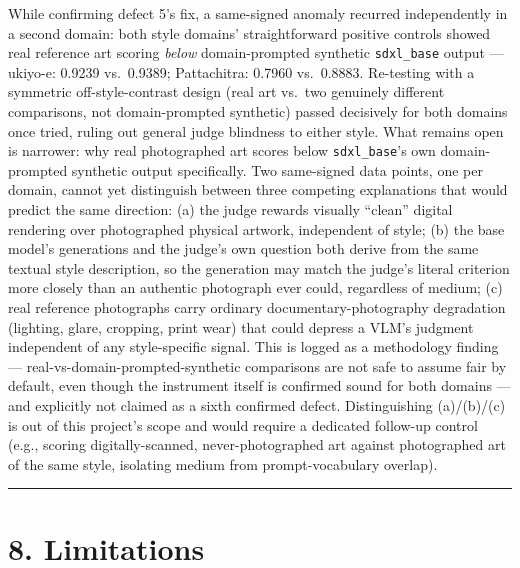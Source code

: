 While confirming defect 5's fix, a same-signed anomaly recurred
independently in a second domain: both style domains' straightforward
positive controls showed real reference art scoring \emph{below}
domain-prompted synthetic \texttt{sdxl\_base} output --- ukiyo-e: 0.9239
vs.~0.9389; Pattachitra: 0.7960 vs.~0.8883. Re-testing with a symmetric
off-style-contrast design (real art vs.~two genuinely different
comparisons, not domain-prompted synthetic) passed decisively for both
domains once tried, ruling out general judge blindness to either style.
What remains open is narrower: why real photographed art scores below
\texttt{sdxl\_base}'s own domain-prompted synthetic output specifically.
Two same-signed data points, one per domain, cannot yet distinguish
between three competing explanations that would predict the same
direction: (a) the judge rewards visually ``clean'' digital rendering
over photographed physical artwork, independent of style; (b) the base
model's generations and the judge's own question both derive from the
same textual style description, so the generation may match the judge's
literal criterion more closely than an authentic photograph ever could,
regardless of medium; (c) real reference photographs carry ordinary
documentary-photography degradation (lighting, glare, cropping, print
wear) that could depress a VLM's judgment independent of any
style-specific signal. This is logged as a methodology finding ---
real-vs-domain-prompted-synthetic comparisons are not safe to assume
fair by default, even though the instrument itself is confirmed sound
for both domains --- and explicitly not claimed as a sixth confirmed
defect. Distinguishing (a)/(b)/(c) is out of this project's scope and
would require a dedicated follow-up control (e.g., scoring
digitally-scanned, never-photographed art against photographed art of
the same style, isolating medium from prompt-vocabulary overlap).

\begin{center}\rule{0.5\linewidth}{0.5pt}\end{center}

\hypertarget{limitations}{%
\section{8. Limitations}\label{limitations}}

